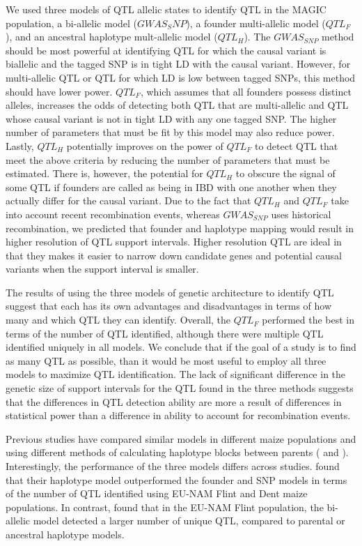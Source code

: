 \documentclass[article,9pt,twocolumn,twoside]{rilabRxiv}
\begin{document}
We used three models of QTL allelic states to identify QTL in the MAGIC population, a bi-allelic model ($GWAS_SNP$), a founder multi-allelic model ($QTL_F$), and an ancestral haplotype mult-allelic model ($QTL_H$).
The $GWAS_{SNP}$ method should be most powerful at identifying QTL for which the causal variant is biallelic and the tagged SNP is in tight LD with the causal variant.
However, for multi-allelic QTL or QTL for which LD is low between tagged SNPs, this method should have lower power.
$QTL_F$, which assumes that all founders possess distinct alleles, increases the odds of detecting both QTL that are multi-allelic and QTL whose causal variant is not in tight LD with any one tagged SNP.
The higher number of parameters that must be fit by this model may also reduce power.
Lastly, $QTL_H$ potentially improves on the power of $QTL_F$ to detect QTL that meet the above criteria by reducing the number of parameters that must be estimated.
There is, however, the potential for $QTL_H$ to obscure the signal of some QTL if founders are called as being in IBD with one another when they actually differ for the causal variant.
Due to the fact that $QTL_H$ and $QTL_F$ take into account recent recombination events, whereas $GWAS_{SNP}$ uses historical recombination, we predicted that founder and haplotype mapping would result in higher resolution of QTL support intervals. Higher resolution QTL are ideal in that they makes it easier to narrow down candidate genes and potential causal variants when the support interval is smaller.


The results of using the three models of genetic architecture to identify QTL suggest that each has its own advantages and disadvantages in terms of how many and which QTL they can identify.
Overall, the $QTL_F$ performed the best in terms of the number of QTL identified, although there were multiple QTL identified uniquely in all models.
We conclude that if the goal of a study is to find as many QTL as possible, than it would be most useful to employ all three models to maximize QTL identification.
The lack of significant difference in the genetic size of support intervals for the QTL found in the three methods suggests that the differences in QTL detection ability are more a result of differences in statistical power than a difference in ability to account for recombination events.

Previous studies have compared similar models in different maize populations and using different methods of calculating haplotype blocks between parents (\cite{Leroux} and \cite{Giraud} \cite{Garin}).
Interestingly, the performance of the three models differs across studies. \cite{Giraud} found that their haplotype model outperformed the founder and SNP models in terms of the number of QTL identified using EU-NAM Flint and Dent maize populations. In contrast, \cite{Garin2} found that in the EU-NAM Flint population, the bi-allelic model detected a larger number of unique QTL, compared to parental or ancestral haplotype models.
\end{document}
